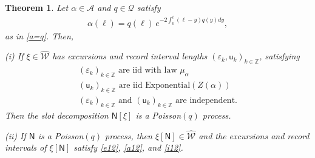 \documentclass[12pt]{article}
\numberwithin{equation}{section}
\newtheorem{theorem}{Theorem}%
\newcommand{\ZZ}{\mathbb Z}
\newcommand{\cW}{\mathcal W}
\newcommand{\sN}{\mathsf{N}}
\newcommand{\su}{{\mathsf{u}}}
\newcommand{\hcW}{\widehat{\cW}}
\newcommand{\vep}{\varepsilon}
\begin{document}
\begin{theorem}
	\label{pro5}
	Let $\alpha \in \mathcal A$ and $q \in \mathscr Q$ satisfy
	\begin{align}
		\label{a=q7}
		\alpha(\ell)=q(\ell)\, e^{-2\int_0^\ell(\ell-y)q(y)dy},
	\end{align}
	as in \eqref{a=q}.
	Then, 
	
	\noindent (i) If $\xi\in\hcW$ has excursions and record interval lengths $(\vep_k, \su_k)_{k\in\ZZ}$, satisfying
	\begin{gather}
		(\vep_k)_{k\in\ZZ} \text{ are iid with law $\mu_\alpha$} \label{e12}\\
		(\su_k)_{k\in\ZZ} \text{ are iid Exponential$(Z(\alpha))$} \label{a12}\\
		(\vep_k)_{k\in\ZZ} \text{ and } (\su_k)_{k\in\ZZ}\text{ are independent.}\label{i12}
	\end{gather}
	Then the slot decomposition $\sN[\xi]$ is a Poisson$(q)$ process.
	
	\noindent (ii) If $\sN$ is a Poisson$(q)$ process, then $\xi[\sN]\in\hcW$ and the excursions and record intervals of $\xi[\sN]$ satisfy \eqref{e12}, \eqref{a12}, and \eqref{i12}.
\end{theorem}
\end{document}
